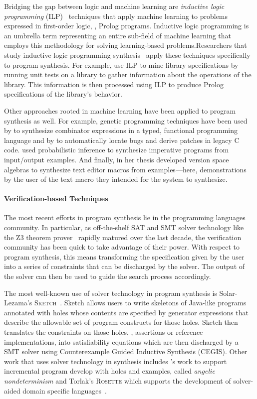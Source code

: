 Bridging the gap between logic and machine learning are \emph{inductive logic programming} (ILP)~\citep{muggleton-jlp-1994} techniques that apply machine learning to problems expressed in first-order logic, \ie, Prolog programs.
Inductive logic programming is an umbrella term representing an entire sub-field of machine learning that employs this methodology for solving learning-based problems.Researchers that study inductive logic programming synthesis~\citep{flener-jlp-1999} apply these techniques specifically to program synthesis.
For example, \citet{sankaranarayanan-icse-2008} use ILP to mine library specifications by running unit tests on a library to gather information about the operations of the library.
This information is then processed using ILP to produce Prolog specifications of the library's behavior.

Other approaches rooted in machine learning have been applied to program synthesis as well.
For example, genetic programming techniques have been used by \citet{briggs-kes-2008} to synthesize combinator expressions in a typed, functional programming language and by \citet{weimer-icse-2009} to automatically locate bugs and derive patches in legacy C code.
\citet{gulwani-popl-2007} used probabilistic inference to synthesize imperative programs from input/output examples.
And finally, \citet{lau-thesis-2001} in her thesis developed version space algebras to synthesize text editor macros from examples---here, demonstrations by the user of the text macro they intended for the system to synthesize.

\paragraph{Verification-based Techniques}

The most recent efforts in program synthesis lie in the programming languages community.
In particular, as off-the-shelf SAT and SMT solver technology like the Z3 theorem prover~\citep{demoura-tacas-2008} rapidly matured over the last decade, the verification community has been quick to take advantage of their power.
With respect to program synthesis, this means transforming the specification given by the user into a series of constraints that can be discharged by the solver.
The output of the solver can then be used to guide the search process accordingly.

The most well-known use of solver technology in program synthesis is Solar-Lezama's \textsc{Sketch}~\citep{solar-lezama-thesis-2008}.
Sketch allows users to write skeletons of Java-like programs annotated with holes whose contents are specified by generator expressions that describe the allowable set of program constructs for those holes.
Sketch then translates the constraints on those holes, \eg, assertions or reference implementations, into satisfiability equations which are then discharged by a SMT solver using Counterexample Guided Inductive Synthesis (CEGIS).
Other work that uses solver technology in synthesis includes \citet{bodik-popl-2010}'s work to support incremental program develop with holes and examples, called \emph{angelic nondeterminism} and Torlak's \textsc{Rosette} which supports the development of solver-aided domain specific languages~\citep{torlak-pldi-2014}.

